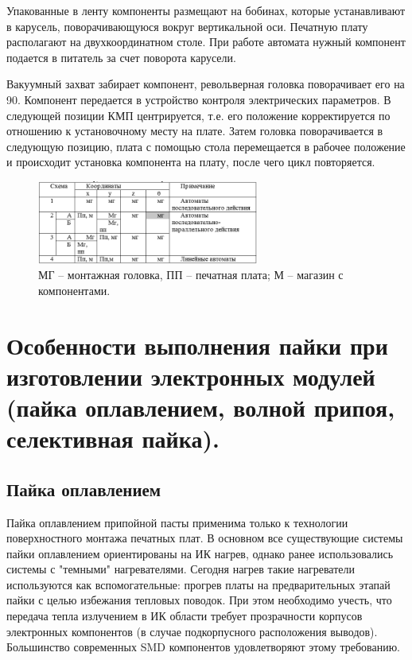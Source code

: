 \documentclass[unicode, 12pt, a4paper, oneside]{article}
\begin{document}
Упакованные в ленту компоненты размещают на бобинах, которые устанавливают в карусель, поворачивающуюся вокруг вертикальной оси. Печатную плату располагают на двухкоординатном столе. При работе автомата нужный компонент подается в питатель за счет поворота карусели.

Вакуумный захват забирает компонент, револьверная головка поворачивает его на 90\textdegree. Компонент передается в устройство контроля электрических параметров. В следующей позиции КМП центрируется, т.е. его положение корректируется по отношению к установочному месту на плате. Затем головка поворачивается в следующую позицию, плата с помощью стола перемещается в рабочее положение и происходит установка компонента на плату, после чего цикл повторяется.

\begin{figure}[htbp]
\centering
\includegraphics[width=0.65\textwidth]{88_table.png}
\caption{МГ – монтажная головка, ПП – печатная плата; М – магазин с компонентами.}
\label{fig:88_table}
\end{figure}


\section{Особенности выполнения пайки при изготовлении электронных модулей (пайка оплавлением, волной припоя, селективная пайка).}

\subsection*{Пайка оплавлением}

Пайка оплавлением припойной пасты применима только к технологии поверхностного монтажа печатных плат. В основном все существующие системы пайки оплавлением ориентированы на ИК нагрев, однако ранее использовались системы с "темными" нагревателями. Сегодня нагрев такие нагреватели используются как вспомогательные: прогрев платы на предварительных этапай пайки с целью избежания тепловых поводок. При этом необходимо учесть, что передача тепла излучением в ИК области требует прозрачности корпусов электронных компонентов (в случае подкорпусного расположения выводов). Большинство современных SMD компонентов удовлетворяют этому требованию.
\end{document}
